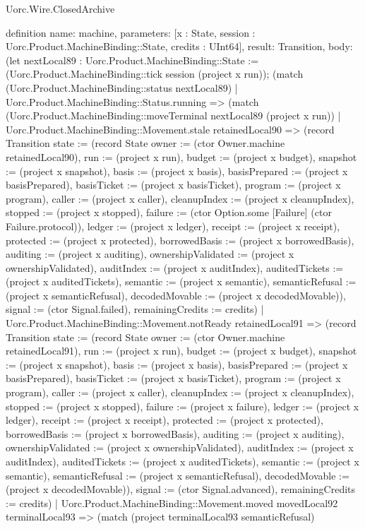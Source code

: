 \begin{lexlean}{Uorc.Wire.ClosedArchive}
\begin{semanticmodule}
definition{
  name: machine,
  parameters: [x : State, session : Uorc.Product.MachineBinding::State, credits : UInt64],
  result: Transition,
  body: (let nextLocal89 : Uorc.Product.MachineBinding::State := (Uorc.Product.MachineBinding::tick session (project x run)); (match (Uorc.Product.MachineBinding::status nextLocal89)
    | Uorc.Product.MachineBinding::Status.running => (match (Uorc.Product.MachineBinding::moveTerminal nextLocal89 (project x run))
      | Uorc.Product.MachineBinding::Movement.stale retainedLocal90 => (record Transition {state := (record State {owner := (ctor Owner.machine retainedLocal90), run := (project x run), budget := (project x budget), snapshot := (project x snapshot), basis := (project x basis), basisPrepared := (project x basisPrepared), basisTicket := (project x basisTicket), program := (project x program), caller := (project x caller), cleanupIndex := (project x cleanupIndex), stopped := (project x stopped), failure := (ctor Option.some [Failure] (ctor Failure.protocol)), ledger := (project x ledger), receipt := (project x receipt), protected := (project x protected), borrowedBasis := (project x borrowedBasis), auditing := (project x auditing), ownershipValidated := (project x ownershipValidated), auditIndex := (project x auditIndex), auditedTickets := (project x auditedTickets), semantic := (project x semantic), semanticRefusal := (project x semanticRefusal), decodedMovable := (project x decodedMovable)}), signal := (ctor Signal.failed), remainingCredits := credits})
      | Uorc.Product.MachineBinding::Movement.notReady retainedLocal91 => (record Transition {state := (record State {owner := (ctor Owner.machine retainedLocal91), run := (project x run), budget := (project x budget), snapshot := (project x snapshot), basis := (project x basis), basisPrepared := (project x basisPrepared), basisTicket := (project x basisTicket), program := (project x program), caller := (project x caller), cleanupIndex := (project x cleanupIndex), stopped := (project x stopped), failure := (project x failure), ledger := (project x ledger), receipt := (project x receipt), protected := (project x protected), borrowedBasis := (project x borrowedBasis), auditing := (project x auditing), ownershipValidated := (project x ownershipValidated), auditIndex := (project x auditIndex), auditedTickets := (project x auditedTickets), semantic := (project x semantic), semanticRefusal := (project x semanticRefusal), decodedMovable := (project x decodedMovable)}), signal := (ctor Signal.advanced), remainingCredits := credits})
      | Uorc.Product.MachineBinding::Movement.moved movedLocal92 terminalLocal93 => (match (project terminalLocal93 semanticRefusal)
}
\end{semanticmodule}
\end{lexlean}
